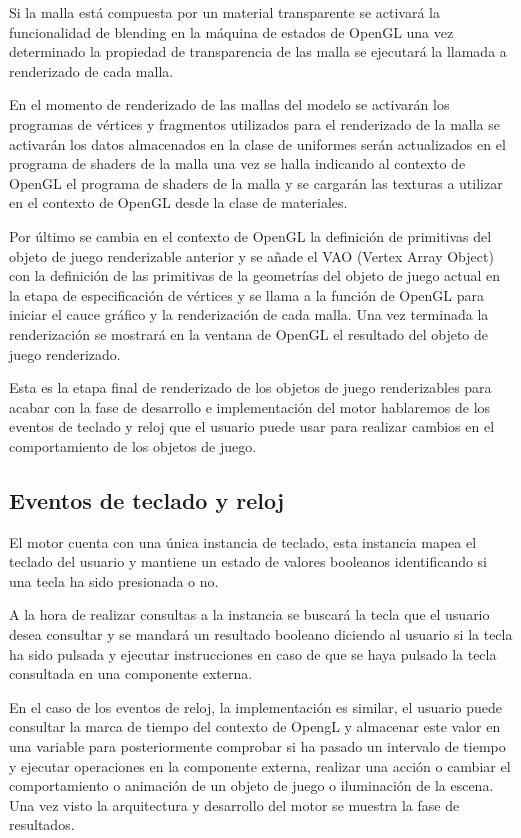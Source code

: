 \documentclass[a4paper, 17pt]{book}
\begin{document}
Si la malla está compuesta por un material transparente se activará la funcionalidad de blending en la máquina de estados de
OpenGL una vez determinado la propiedad de transparencia de las malla se ejecutará la llamada a renderizado de cada malla. 

En el momento de renderizado de las mallas del modelo se activarán los programas de vértices y fragmentos utilizados para el
renderizado de la malla se activarán los datos almacenados en la clase de uniformes serán actualizados en el programa de shaders
de la malla una vez se halla indicando al contexto de OpenGL el programa de shaders de la malla y se cargarán las texturas a
utilizar en el contexto de OpenGL desde la clase de materiales.

Por último se cambia en el contexto de OpenGL la definición de primitivas del objeto de juego renderizable anterior y se añade
el VAO (Vertex Array Object) con la definición de las primitivas de la geometrías del objeto de juego actual en la etapa de
especificación de vértices y se llama a la función de OpenGL para iniciar el cauce gráfico y la renderización de cada malla.
Una vez terminada la renderización se mostrará en la ventana de OpenGL el resultado del objeto de juego renderizado.

Esta es la etapa final de renderizado de los objetos de juego renderizables para acabar con la fase de desarrollo e implementación
del motor hablaremos de los eventos de teclado y reloj que el usuario puede usar para realizar cambios en el comportamiento de
los objetos de juego.

\subsection{Eventos de teclado y reloj}
\label{subsec:eventos}

El motor cuenta con una única instancia de teclado, esta instancia mapea el teclado del usuario y mantiene un estado de valores
booleanos identificando si una tecla ha sido presionada o no. 

A la hora de realizar consultas a la instancia se buscará la tecla que el usuario desea consultar y se mandará un resultado
booleano diciendo al usuario si la tecla ha sido pulsada y ejecutar instrucciones en caso de que se haya pulsado la tecla
consultada en una componente externa.

En el caso de los eventos de reloj, la implementación es similar, el usuario puede consultar la marca de tiempo del contexto
de OpengL y almacenar este valor en una variable para posteriormente comprobar si ha pasado un intervalo de tiempo y ejecutar
operaciones en la componente externa, realizar una acción o cambiar el comportamiento o animación de un objeto de juego o
iluminación de la escena. Una vez visto la arquitectura y desarrollo del motor se muestra la fase de resultados.
\end{document}
